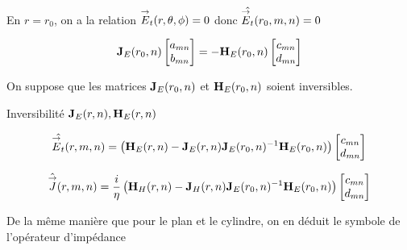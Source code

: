         En \(r=r_0\), on a la relation \({\overset{\rightarrow}{E}}_t(r,\theta,\phi) = 0\) donc \(\hat{{\overset{\rightarrow}{E}}_t}(r_0,m,n) = 0 \)

        \begin{equation}
            \mathbf{J}_{E}(r_0,n)
            \begin{bmatrix}
                a_{mn}
                \\
                b_{mn}
            \end{bmatrix}
            = - 
            \mathbf{H}_{E}(r_0,n)
            \begin{bmatrix}
                c_{mn}
                \\
                d_{mn}
            \end{bmatrix}
        \end{equation}

        On suppose que les matrices \(\mathbf{J}_{E}(r_0,n)\) et \(\mathbf{H}_{E}(r_0,n)\) soient inversibles.

        \begin{TODO}
          Inversibilité \(\mathbf{J}_{E}(r,n), \mathbf{H}_{E}(r,n)\)
        \end{TODO}

        \begin{equation}
            \hat{{\overset{\rightarrow}{E}}_t}(r,m,n) = 
            \left(
                \mathbf{H}_{E}(r,n)
                -
                \mathbf{J}_{E}(r,n)
                \mathbf{J}_{E}(r_0,n)^{-1}
                \mathbf{H}_{E}(r_0,n)
            \right)
            \begin{bmatrix}
                c_{mn}
                \\
                d_{mn}
            \end{bmatrix}
        \end{equation}


        \begin{equation}
            \hat{{\overset{\rightarrow}{J}}}(r,m,n) = \dfrac{i}{\eta}
            \left(
                \mathbf{H}_{H}(r,n)
                -
                \mathbf{J}_{H}(r,n)
                \mathbf{J}_{E}(r_0,n)^{-1}
                \mathbf{H}_{E}(r_0,n)
            \right)
            \begin{bmatrix}
                c_{mn}
                \\
                d_{mn}
            \end{bmatrix}
        \end{equation}

        De la même manière que pour le plan et le cylindre, on en déduit le symbole de l'opérateur d'impédance

